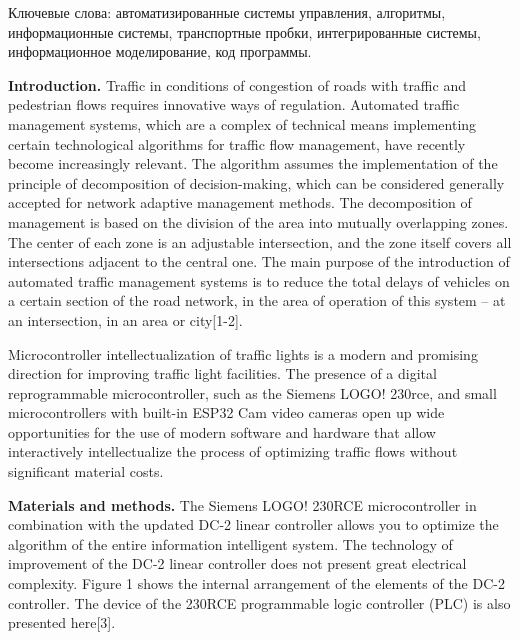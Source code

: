 Ключевые слова: автоматизированные системы управления, алгоритмы,
информационные системы, транспортные пробки, интегрированные системы,
информационное моделирование, код программы.

\begin{multicols}{2}
{\bfseries Introduction.} Traffic in conditions of congestion of roads with
traffic and pedestrian flows requires innovative ways of regulation.
Automated traffic management systems, which are a complex of technical
means implementing certain technological algorithms for traffic flow
management, have recently become increasingly relevant. The algorithm
assumes the implementation of the principle of decomposition of
decision-making, which can be considered generally accepted for network
adaptive management methods. The decomposition of management is based on
the division of the area into mutually overlapping zones. The center of
each zone is an adjustable intersection, and the zone itself covers all
intersections adjacent to the central one. The main purpose of the
introduction of automated traffic management systems is to reduce the
total delays of vehicles on a certain section of the road network, in
the area of operation of this system -- at an intersection, in an area
or city{[}1-2{]}.

Microcontroller intellectualization of traffic lights is a modern and
promising direction for improving traffic light facilities. The presence
of a digital reprogrammable microcontroller, such as the Siemens LOGO!
230rce, and small microcontrollers with built-in ESP32 Cam video cameras
open up wide opportunities for the use of modern software and hardware
that allow interactively intellectualize the process of optimizing
traffic flows without significant material costs.

{\bfseries Materials and methods.} The Siemens LOGO! 230RCE microcontroller
in combination with the updated DC-2 linear controller allows you to
optimize the algorithm of the entire information intelligent system. The
technology of improvement of the DC-2 linear controller does not present
great electrical complexity. Figure 1 shows the internal arrangement of
the elements of the DC-2 controller. The device of the 230RCE
programmable logic controller (PLC) is also presented here{[}3{]}.
\end{multicols}

